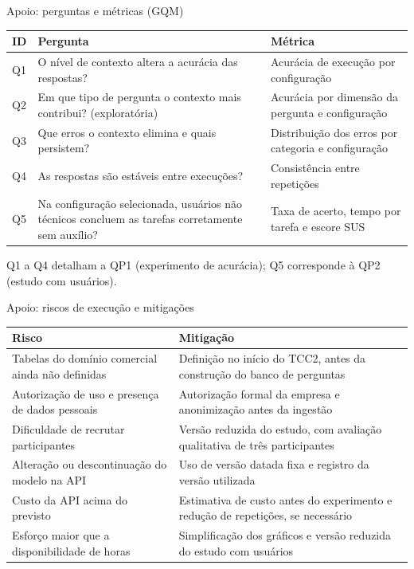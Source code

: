 \documentclass[aspectratio=169,10pt]{beamer}
\newcommand{\cab}[1]{\textcolor{UnBAzul}{\textbf{#1}}}
\begin{document}
\begin{frame}{Apoio: perguntas e métricas (GQM)}
  \small
  \begin{tabular}{@{}lL{70mm}L{55mm}@{}}
    \toprule
    \cab{ID} & \cab{Pergunta} & \cab{Métrica}\\
    \midrule
    Q1 & O nível de contexto altera a acurácia das respostas? & Acurácia de execução por configuração\\
    Q2 & Em que tipo de pergunta o contexto mais contribui? (exploratória) & Acurácia por dimensão da pergunta e configuração\\
    Q3 & Que erros o contexto elimina e quais persistem? & Distribuição dos erros por categoria e configuração\\
    Q4 & As respostas são estáveis entre execuções? & Consistência entre repetições\\
    Q5 & Na configuração selecionada, usuários não técnicos concluem as tarefas corretamente sem auxílio? &
      Taxa de acerto, tempo por tarefa e escore SUS\\
    \bottomrule
  \end{tabular}
  \vspace{2mm}

  {\footnotesize\color{UnBCinza}Q1 a Q4 detalham a QP1 (experimento de acurácia); Q5 corresponde à QP2 (estudo com usuários).}
\end{frame}

\begin{frame}{Apoio: riscos de execução e mitigações}
  \small
  \begin{tabular}{@{}L{62mm}L{76mm}@{}}
    \toprule
    \cab{Risco} & \cab{Mitigação}\\
    \midrule
    Tabelas do domínio comercial ainda não definidas & Definição no início do TCC2, antes da construção do banco de perguntas\\
    Autorização de uso e presença de dados pessoais & Autorização formal da empresa e anonimização antes da ingestão\\
    Dificuldade de recrutar participantes & Versão reduzida do estudo, com avaliação qualitativa de três participantes\\
    Alteração ou descontinuação do modelo na API & Uso de versão datada fixa e registro da versão utilizada\\
    Custo da API acima do previsto & Estimativa de custo antes do experimento e redução de repetições, se necessário\\
    Esforço maior que a disponibilidade de horas & Simplificação dos gráficos e versão reduzida do estudo com usuários\\
    \bottomrule
  \end{tabular}
\end{frame}
\end{document}
